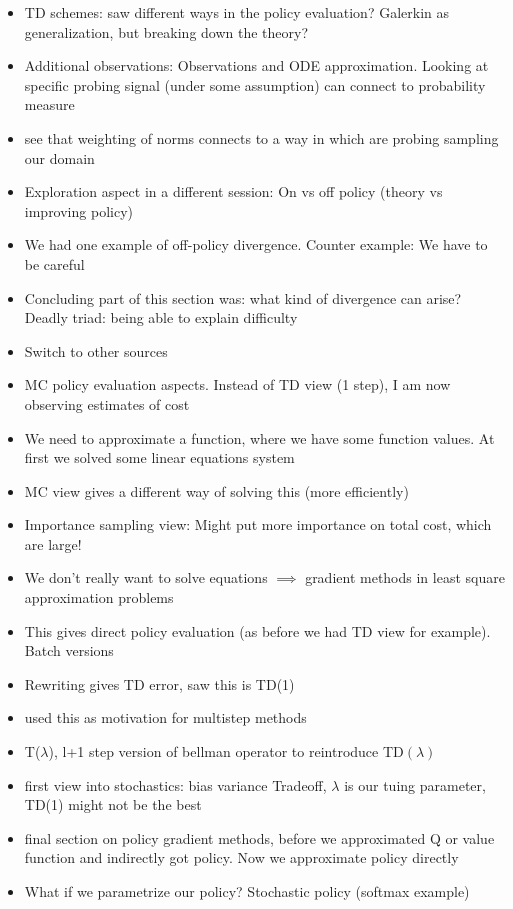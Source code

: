 \begin{itemize}
    \item TD schemes: saw different ways in the policy evaluation? Galerkin as generalization, but breaking down the theory? 
    \item Additional observations: Observations and ODE approximation. Looking at specific probing signal (under some assumption) can connect to probability measure 
    \item see that weighting of norms connects to a way in which are probing sampling our domain 
    \item Exploration aspect in a different session: On vs off policy (theory vs improving policy)
    \item We had one example of off-policy divergence. Counter example: We have to be careful 
    \item Concluding part of this section was: what kind of divergence can arise? Deadly triad: being able to explain difficulty 
    \item Switch to other sources 
    \item MC policy evaluation aspects. Instead of TD view (1 step), I am now observing estimates of cost 
    \item We need to approximate a function, where we have some function values. At first we solved some linear equations system 
    \item MC view gives a different way of solving this (more efficiently)
    \item Importance sampling view: Might put more importance on total cost, which are large! 
    \item We don't really want to solve equations \(\implies\) gradient methods in least square approximation problems 
    \item This gives direct policy evaluation (as before we had TD view for example). Batch versions 
    \item Rewriting gives TD error, saw this is TD(1)
    \item used this as motivation for multistep methods 
    \item T(\(\lambda\)), l+1 step version of bellman operator to reintroduce TD\((\lambda)\)
    \item first view into stochastics: bias variance Tradeoff, \(\lambda\) is our tuing parameter, TD(1) might not be the best
    \item final section on policy gradient methods, before we approximated Q or value function and indirectly got policy. Now we approximate policy directly
    \item What if we parametrize our policy? Stochastic policy (softmax example)

\end{itemize}
